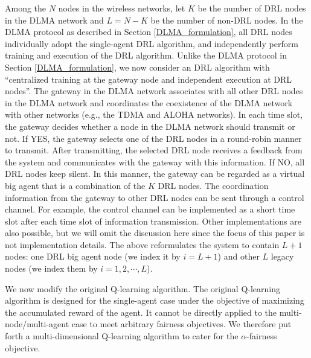 \documentclass[journal,comsoc]{IEEEtran}
\begin{document}
Among the  $ N $  nodes in the wireless networks, let $ K $  be the number of DRL nodes in the DLMA network and  $ L=N-K $ be the number of non-DRL nodes. In the DLMA protocol as described in Section \ref{DLMA_formulation},  all DRL nodes individually adopt the single-agent DRL algorithm, and independently perform training and execution of the DRL algorithm.  Unlike the DLMA protocol in Section \ref{DLMA_formulation}, we now consider an DRL algorithm with ``centralized training at the gateway node and independent execution at DRL nodes''. The gateway in the DLMA network associates with all other DRL nodes in the DLMA network and coordinates the coexistence of the DLMA network with other networks (e.g., the TDMA and ALOHA networks).  In each time slot, the gateway decides whether a node in the DLMA network should transmit or not. If YES,  the gateway selects one of the DRL nodes in a round-robin manner to transmit. After transmitting, the selected DRL node receives a feedback from the system and communicates with the gateway with this information. If NO, all DRL nodes keep silent. In this manner, the  gateway can be regarded as a virtual big agent that is a combination of  the $ K $  DRL nodes. The coordination information from the gateway  to other DRL nodes can be sent through a control channel. For example, the control channel can be implemented as a short time slot after each time slot of information transmission. Other implementations are also possible, but we will omit the discussion here since the focus of this paper is not implementation details. The above reformulates the system to contain  $ L+1 $ nodes: one DRL big agent node (we index it by  $ i=L+1 $)  and other $ L $  legacy nodes (we index them by  $ i=1,2,\cdots, L $). 

We now modify the original Q-learning algorithm. The original Q-learning algorithm is designed for the single-agent case under the objective of maximizing the accumulated reward of the agent. It cannot be directly applied to the multi-node/multi-agent  case to meet arbitrary fairness objectives. We therefore put forth a multi-dimensional Q-learning algorithm to cater for the  $ \alpha $-fairness objective.  
\end{document}
